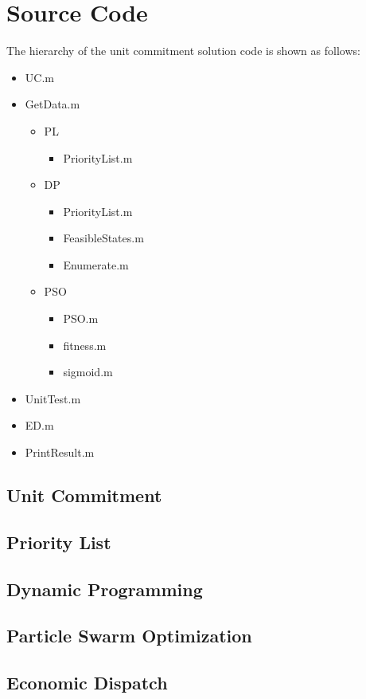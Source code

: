 \documentclass[a4paper, 12pt, notitlepage]{report}
\begin{document}
\chapter{Source Code}
The hierarchy of the unit commitment solution code is shown as follows:
\begin{itemize}
  \item UC.m
  \item GetData.m
  \begin{itemize}
    \item PL
    \begin{itemize}
      \item PriorityList.m
    \end{itemize}
    \item DP
    \begin{itemize}
      \item PriorityList.m
      \item FeasibleStates.m
      \item Enumerate.m
    \end{itemize}
    \item PSO
    \begin{itemize}
      \item PSO.m
      \item fitness.m
      \item sigmoid.m
    \end{itemize}
  \end{itemize}
  \item UnitTest.m
  \item ED.m
  \item PrintResult.m
\end{itemize}

\section{Unit Commitment}

\section{Priority List}

\section{Dynamic Programming}

\section{Particle Swarm Optimization}

\section{Economic Dispatch}

\end{document}

